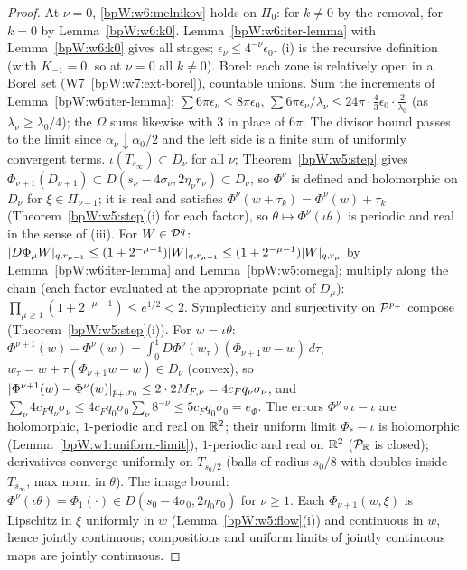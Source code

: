 \begin{proof}
\label{stepW:w6:c-ind} At $\nu=0$, \eqref{bpW:w6:melnikov} holds on $\Pi_0$: for $k\ne0$ by the removal, for $k=0$ by
Lemma~\ref{bpW:w6:k0}. Lemma~\ref{bpW:w6:iter-lemma} with Lemma~\ref{bpW:w6:k0} gives all stages; $\epsilon_\nu\le4^{-\nu}\epsilon_0$.
\label{stepW:w6:c-par} (i) is the recursive definition (with $K_{-1}=0$, so at $\nu=0$ all $k\ne0$).
Borel: each zone is relatively open in a Borel set (W7~\ref{bpW:w7:ext-borel}), countable unions.
\label{stepW:w6:c-freq} Sum the increments of Lemma~\ref{bpW:w6:iter-lemma}: $\sum6\pi\epsilon_\nu\le8\pi\epsilon_0$,
$\sum6\pi\epsilon_\nu/\lambda_\nu\le24\pi\cdot\frac43\epsilon_0\cdot\frac2{\lambda_0}$ (as $\lambda_\nu\ge\lambda_0/4$); the $\Omega$ sums likewise
with $3$ in place of $6\pi$. The divisor bound passes to the limit since $\alpha_\nu\downarrow\alpha_0/2$ and the left side is a finite
sum of uniformly convergent terms.
\label{stepW:w6:c-dom} $\iota(T_{s_\infty})\subset D_\nu$ for all $\nu$; Theorem~\ref{bpW:w5:step} gives
$\Phi_{\nu+1}(D_{\nu+1})\subset D(s_\nu-4\sigma_\nu,2\eta_\nu r_\nu)\subset D_\nu$, so $\Phi^\nu$ is defined and holomorphic on $D_\nu$ for
$\xi\in\Pi_{\nu-1}$; it is real and satisfies $\Phi^\nu(w+\tau_k)=\Phi^\nu(w)+\tau_k$ (Theorem~\ref{bpW:w5:step}(i) for each factor), so
$\theta\mapsto\Phi^\nu(\iota\theta)$ is periodic and real in the sense of (iii).
\label{stepW:w6:c-op} For $W\in\mathcal P^q$: $\lvert D\Phi_\mu W\rvert_{q,r_{\mu-1}}\le(1+2^{-\mu-1})\lvert W\rvert_{q,r_{\mu-1}}\le
(1+2^{-\mu-1})\lvert W\rvert_{q,r_\mu}$ by Lemma~\ref{bpW:w6:iter-lemma} and Lemma~\ref{bpW:w5:omega}; multiply along the chain
(each factor evaluated at the appropriate point of $D_\mu$): $\prod_{\mu\ge1}(1+2^{-\mu-1})\le e^{1/2}<2$. Symplecticity and
surjectivity on $\mathcal P^{p_+}$ compose (Theorem~\ref{bpW:w5:step}(i)).
\label{stepW:w6:c-cauchy} For $w=\iota\theta$: $\Phi^{\nu+1}(w)-\Phi^\nu(w)=\int_0^1D\Phi^\nu(w_\tau)(\Phi_{\nu+1}w-w)\,d\tau$,
$w_\tau=w+\tau(\Phi_{\nu+1}w-w)\in D_\nu$ (convex), so $\lvert \Phi^{\nu+1}(w)-\Phi^\nu(w)\rvert_{p_+,r_0}\le2\cdot2M_{F,\nu}=4c_Fq_\nu\sigma_\nu$, and
$\sum_\nu4c_Fq_\nu\sigma_\nu\le4c_Fq_0\sigma_0\sum_\nu8^{-\nu}\le5c_Fq_0\sigma_0=e_\Phi$.
\label{stepW:w6:c-lim} The errors $\Phi^\nu\circ\iota-\iota$ are holomorphic, $1$-periodic and real on $\mathbb{R}^2$;
their uniform limit $\Phi_*-\iota$ is holomorphic (Lemma~\ref{bpW:w1:uniform-limit}), $1$-periodic and real on $\mathbb{R}^2$ ($\mathcal P_{\mathbb{R}}$ is
closed); derivatives converge uniformly on $T_{s_0/2}$ (balls of radius $s_0/8$ with doubles inside
$T_{s_\infty}$, max norm in $\theta$). The image bound: $\Phi^\nu(\iota\theta)=\Phi_1(\cdot)\in D(s_0-4\sigma_0,2\eta_0r_0)$ for $\nu\ge1$.
\label{stepW:w6:c-cont} Each $\Phi_{\nu+1}(w,\xi)$ is Lipschitz in $\xi$ uniformly in $w$ (Lemma~\ref{bpW:w5:flow}(i))
and continuous in $w$, hence jointly continuous; compositions and uniform limits of jointly continuous maps are jointly
continuous.
\end{proof}
